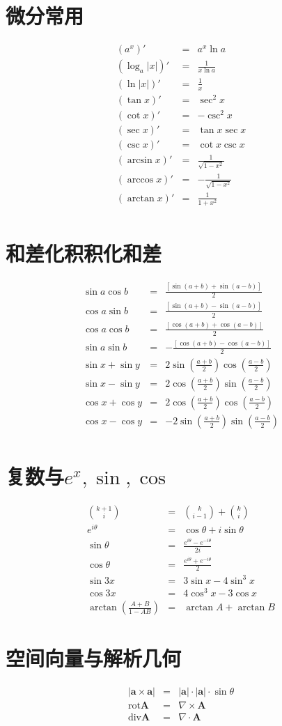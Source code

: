 \documentclass[UTF8]{ctexart}
\begin{document}
\section{微分常用}
\begin{eqnarray*}
(a^x)'&=&a^x\ln a\\
(\log_a |x|)' &=& \frac{1}{x\ln a}\\
(\ln |x|)' &=& \frac{1}{x}\\
(\tan x)' &=& \sec^2 x\\
(\cot x)' &=& -\csc^2 x\\
(\sec x)' &=& \tan x\sec x\\
(\csc x)' &=& \cot x\csc x\\
(\arcsin x)' &=& \frac{1}{\sqrt{1-x^2}}\\
(\arccos x)' &=& -\frac{1}{\sqrt{1-x^2}}\\
(\arctan x)' &=& \frac{1}{1+x^2}\\
\end{eqnarray*}


\section{和差化积积化和差}
\begin{eqnarray*}
\sin a \cos b&=&\frac{[\sin(a+b)+\sin(a-b)]}{2} \\
\cos a \sin b&=&\frac{[\sin(a+b)-\sin(a-b)]}{2} \\
\cos a \cos b&=&\frac{[\cos(a+b)+\cos(a-b)]}{2} \\
\sin a \sin b&=&-\frac{[\cos(a+b)-\cos(a-b)]}{2} \\
\sin x+\sin y&=&2\sin(\frac{a+b}{2})\cos(\frac{a-b}{2})\\
\sin x-\sin y&=&2\cos(\frac{a+b}{2})\sin(\frac{a-b}{2})\\
\cos x+\cos y&=&2\cos(\frac{a+b}{2})\cos(\frac{a-b}{2})\\
\cos x-\cos y&=&-2\sin(\frac{a+b}{2})\sin(\frac{a-b}{2})\\
\end{eqnarray*}

\section{复数与$e^x,\sin,\cos$}
\begin{eqnarray*}
\binom{k+1}{i}&=&\binom{k}{i-1}+\binom{k}{i}\\
e^{i\theta} &=& \cos\theta +i\sin\theta\\
\sin \theta &=& \frac{e^{i\theta}-e^{-i\theta}}{2i}\\
\cos \theta &=& \frac{e^{i\theta}+e^{-i\theta}}{2}\\
\sin 3x &=& 3\sin x-4\sin^3 x\\
\cos 3x &=& 4\cos^3 x-3\cos x\\
\arctan\left(\frac{A+B}{1-AB}\right) &=& \arctan A+\arctan B
\end{eqnarray*}
\section{空间向量与解析几何}
\begin{eqnarray*}
|\mathbf{a}\times \mathbf{a}|&=&|\mathbf{a}|\cdot|\mathbf{a}|\cdot \sin \theta\\
\text{rot}\mathbf{A} & = & \nabla \times \mathbf{A}\\
\text{div}\mathbf{A} & = & \nabla \cdot \mathbf{A}
\end{eqnarray*}
\end{document}
